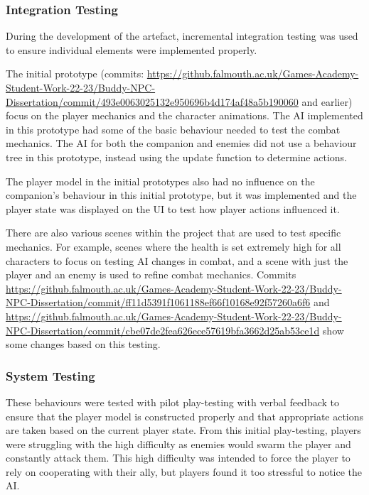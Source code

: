 \documentclass{IEEEtran}
\begin{document}
\subsubsection{Integration Testing}

During the development of the artefact, incremental integration testing was used to ensure individual elements were implemented properly.

The initial prototype (commits: \url{https://github.falmouth.ac.uk/Games-Academy-Student-Work-22-23/Buddy-NPC-Dissertation/commit/493e0063025132e950696b4d174af48a5b190060} and earlier) focus on the player mechanics and the character animations. The AI implemented in this prototype had some of the basic behaviour needed to test the combat mechanics. The AI for both the companion and enemies did not use a behaviour tree in this prototype, instead using the update function to determine actions.

The player model in the initial prototypes also had no influence on the companion's behaviour in this initial prototype, but it was implemented and the player state was displayed on the UI to test how player actions influenced it.

There are also various scenes within the project that are used to test specific mechanics. For example, scenes where the health is set extremely high for all characters to focus on testing AI changes in combat, and a scene with just the player and an enemy is used to refine combat mechanics. Commits \url{https://github.falmouth.ac.uk/Games-Academy-Student-Work-22-23/Buddy-NPC-Dissertation/commit/ff11d5391f1061188ef66f10168e92f57260a6f6} and \url{https://github.falmouth.ac.uk/Games-Academy-Student-Work-22-23/Buddy-NPC-Dissertation/commit/cbe07de2fea626ece57619bfa3662d25ab53ce1d} show some changes based on this testing.

\subsubsection{System Testing}

These behaviours were tested with pilot play-testing with verbal feedback to ensure that the player model is constructed properly and that appropriate actions are taken based on the current player state. From this initial play-testing, players were struggling with the high difficulty as enemies would swarm the player and constantly attack them. This high difficulty was intended to force the player to rely on cooperating with their ally, but players found it too stressful to notice the AI.
\end{document}
